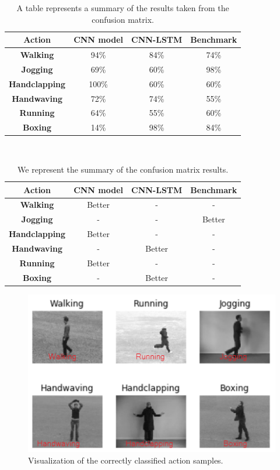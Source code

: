 \begin{table}[ht]
\caption{A table represents a summary of the results taken from the confusion matrix.}

\centering
\begin{tabular}{|c|c|c|c|}
\hline
\textbf{Action} & \textbf{CNN model} & \textbf{CNN-LSTM} & \textbf{Benchmark} \\ \hline
\textbf{Walking} & 94\% & 84\% & 74\% \\ \hline
\textbf{Jogging} & 69\% & 60\% & 98\% \\ \hline
\textbf{Handclapping} & 100\% & 60\% & 60\% \\ \hline
\textbf{Handwaving} & 72\% & 74\% & 55\% \\ \hline
\textbf{Running} & 64\% & 55\% & 60\% \\ \hline
\textbf{Boxing} & 14\% & 98\% & 84\% \\ \hline
\end{tabular}
\label{my-label}
\end{table}\\

\begin{table}[]
\caption{We represent the summary of the confusion matrix results.}
\centering
\begin{tabular}{|c|c|c|c|}
\hline
\textbf{Action} & \textbf{CNN model} & \textbf{CNN-LSTM} & \textbf{Benchmark} \\ \hline
\textbf{Walking} & Better & - & - \\ \hline
\textbf{Jogging} & - & - & Better \\ \hline
\textbf{Handclapping} & Better & - & - \\ \hline
\textbf{Handwaving} & - & Better & - \\ \hline
\textbf{Running} & Better & - & - \\ \hline
\textbf{Boxing} & - & Better & - \\ \hline
\end{tabular}

\label{my-label}
\end{table}

\begin{figure}[ht] 
\centering
\includegraphics[width=1.0\columnwidth]{Figures/classified.png}
\decoRule
\caption[Visualization of the correctly classified action samples.]{Visualization of the correctly classified action samples.}
\label{fig:classified1}
\end{figure}



